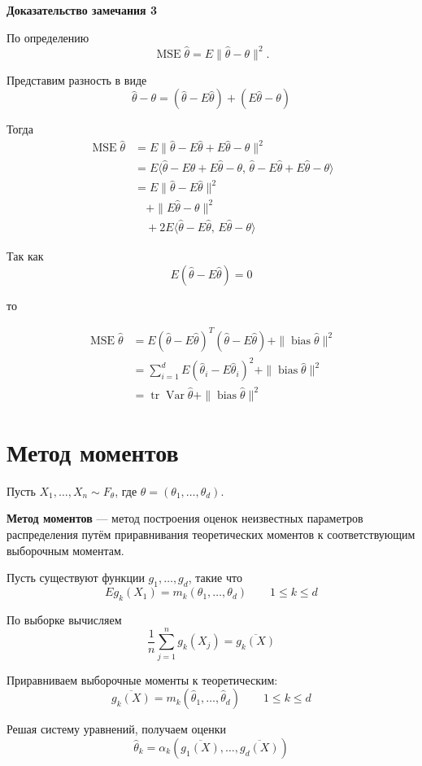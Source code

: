 \documentclass[12pt,a4paper]{article}
\begin{document}
\textbf{Доказательство замечания 3}

\begin{proofbox}

По определению
\[
\operatorname{MSE}\hat{\theta}
=
E\|\hat{\theta}-\theta\|^2.
\]

Представим разность в виде
\[
\hat{\theta}-\theta
=
(\hat{\theta}-E\hat{\theta})
+
(E\hat{\theta}-\theta)
\]

Тогда
\[
\begin{aligned}
\operatorname{MSE}\hat{\theta}
&=
E\|\hat{\theta}-E\hat{\theta}
+E\hat{\theta}-\theta\|^2\\
&=
E\langle
\hat{\theta}-E\hat{\theta}
+E\hat{\theta}-\theta,\,
\hat{\theta}-E\hat{\theta}
+E\hat{\theta}-\theta
\rangle\\
&=
E\|\hat{\theta}-E\hat{\theta}\|^2\\
&\quad+
\|E\hat{\theta}-\theta\|^2\\
&\quad+
2E\langle
\hat{\theta}-E\hat{\theta},\,
E\hat{\theta}-\theta
\rangle
\end{aligned}
\]

Так как
\[
E(\hat{\theta}-E\hat{\theta})=0
\]

то

\[
\begin{aligned}
\operatorname{MSE}\hat{\theta}
&=
E(\hat{\theta}-E\hat{\theta})^T
(\hat{\theta}-E\hat{\theta})
+
\|\operatorname{bias}\hat{\theta}\|^2\\
&=
\sum_{i=1}^{d}
E(\hat{\theta}_i-E\hat{\theta}_i)^2
+
\|\operatorname{bias}\hat{\theta}\|^2\\
&=
\operatorname{tr}\operatorname{Var}\hat{\theta}
+
\|\operatorname{bias}\hat{\theta}\|^2
\end{aligned}
\]

\end{proofbox}

\newpage

\section{Метод моментов}

Пусть $X_1,\ldots,X_n\sim F_\theta$, где
$\theta=(\theta_1,\ldots,\theta_d)$.

\begin{definition}

\textbf{Метод моментов} — метод построения оценок неизвестных параметров распределения путём приравнивания теоретических моментов к соответствующим выборочным моментам.

Пусть существуют функции $g_1,\ldots,g_d$, такие что
\[
Eg_k(X_1)=m_k(\theta_1,\ldots,\theta_d)
\qquad 1\le k\le d
\]

По выборке вычисляем
\[
\frac{1}{n}\sum_{j=1}^{n}g_k(X_j)
=
\overline{g_k(X)}
\]

Приравниваем выборочные моменты к теоретическим:
\[
\overline{g_k(X)}
=
m_k(\hat{\theta}_1,\ldots,\hat{\theta}_d)
\qquad 1\le k\le d
\]

Решая систему уравнений, получаем оценки
\[
\hat{\theta}_k
=
\alpha_k\left(
\overline{g_1(X)},\ldots,
\overline{g_d(X)}
\right)
\]

\end{definition}
\end{document}
